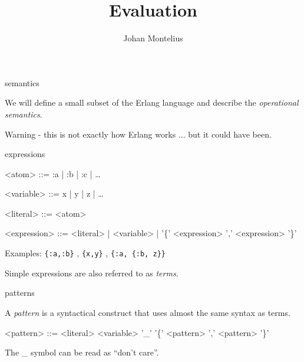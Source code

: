 

\title[ID1019 Evaluation]{Evaluation}


\author{Johan Montelius}
\date{\semester}



\begin{frame}
\titlepage
\end{frame}

\begin{frame}{semantics}

We will define a small subset of the Erlang language and describe the
{\em operational semantics}.


\pause \vspace{40pt}Warning - this is not exactly how Erlang works ... but it could have been.

\end{frame}


\begin{frame}{expressions}

\begin{grammar}
<atom> ::= :a | :b | :c | \ldots

<variable> ::= x | y | z | \ldots

<literal> ::= <atom>

<expression> ::= <literal> | <variable> |  '\{' <expression> ',' <expression> '\}'
\end{grammar}


\pause \vspace{20pt} Examples: {\tt \{:a,:b\}} , {\tt \{x,y\}} , {\tt \{:a, \{:b, z\}\}}

\pause \vspace{20pt} Simple expressions are also referred to as {\em terms}.
\end{frame}

\begin{frame}{patterns}

  A {\em pattern} is a syntactical construct that uses almost the same
  syntax as terms.

  \pause
  \vspace{20pt}

\begin{grammar}
<pattern> ::= <literal> 
      \alt <variable> 
      \alt '\_' 
      \alt '\{' <pattern> ',' <pattern> '\}'
\end{grammar}

 \pause \vspace{20pt}
  The \_ symbol can be read as ``don't care''.

\end{frame}





